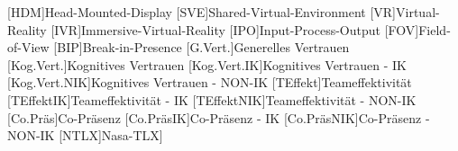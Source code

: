 \begin{acronym}
	[HDM]{Head-Mounted-Display}
	[SVE]{Shared-Virtual-Environment}
	[VR]{Virtual-Reality}
	[IVR]{Immersive-Virtual-Reality}
	[IPO]{Input-Process-Output}
	[FOV]{Field-of-View}
	[BIP]{Break-in-Presence}
	[G.Vert.]{Generelles Vertrauen}
	[Kog.Vert.]{Kognitives Vertrauen}
	[Kog.Vert.IK]{Kognitives Vertrauen - IK}
	[Kog.Vert.NIK]{Kognitives Vertrauen - NON-IK}
	[TEffekt]{Teameffektivität}
	[TEffektIK]{Teameffektivität - IK}
	[TEffektNIK]{Teameffektivität - NON-IK}
	[Co.Präs]{Co-Präsenz}
	[Co.PräsIK]{Co-Präsenz - IK}
	[Co.PräsNIK]{Co-Präsenz - NON-IK}
	[NTLX]{Nasa-TLX]}
\end{acronym}
